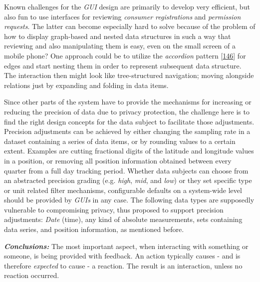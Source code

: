 \documentclass[12pt,english,a4paper,titlepage,cleardoublepage=empty,dottedtoc]{report}
\begin{document}
Known challenges for the \emph{GUI} design are primarily to develop very
efficient, but also fun to use interfaces for reviewing \emph{consumer
registrations} and \emph{permission requests}. The latter can become
especially hard to solve because of the problem of how to display
graph-based and nested data structures in such a way that reviewing and
also manipulating them is easy, even on the small screen of a mobile
phone? One approach could be to utilize the \emph{accordion} pattern
{[}\protect\hyperlink{ref-web_2016_wikipedia_accordion-gui}{146}{]} for
edges and start nesting them in order to represent subsequent data
structure. The interaction then might look like tree-structured
navigation; moving alongside relations just by expanding and folding in
data items.

Since other parts of the system have to provide the mechanisms for
increasing or reducing the precision of data due to privacy protection,
the challenge here is to find the right design concepts for the data
subject to facilitate those adjustments. Precision adjustments can be
achieved by either changing the sampling rate in a dataset containing a
series of data items, or by rounding values to a certain extent.
Examples are cutting fractional digits of the latitude and longitude
values in a position, or removing all position information obtained
between every quarter from a full day tracking period. Whether data
subjects can choose from an abstracted precision grading (e.g.
\emph{high}, \emph{mid}, and \emph{low}) or they set specific type or
unit related filter mechanisms, configurable defaults on a system-wide
level should be provided by \emph{GUIs} in any case. The following data
types are supposedly vulnerable to compromising privacy, thus proposed
to support precision adjustments: \emph{Date} (time), any kind of
absolute measurements, sets containing data series, and position
information, as mentioned before.

\emph{\textbf{Conclusions:}} The most important aspect, when interacting
with something or someone, is being provided with feedback. An action
typically causes - and is therefore \emph{expected} to cause - a
reaction. The result is an interaction, unless no reaction occurred.
\end{document}
